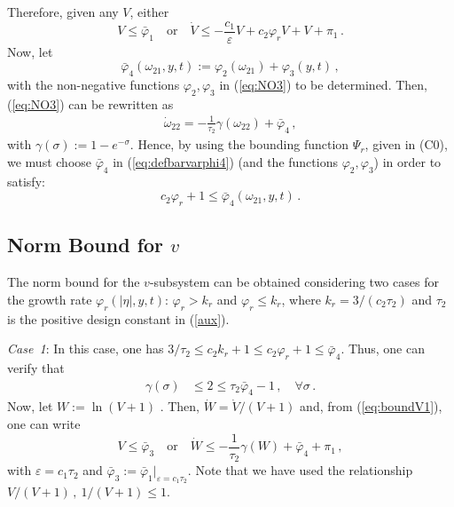 \documentclass{rncauth}
\begin{document}
Therefore, given any $V$, either %
%
\begin{equation}
V\leq\bar{\varphi}_1\quad \mbox{or} \quad \dot{V} \leq
-\frac{c_1}{\varepsilon} V +c_2 \varphi_r V+V+\pi_1\,.
\label{eq:boundV1}
\end{equation}
%
Now, let
%
\begin{equation}
\bar{\varphi}_4(\omega_{21},y,t):=\varphi_2(\omega_{21})+\varphi_3(y,t)\,,\label{eq:defbarvarphi4}
\end{equation}
%
with the non-negative functions $\varphi_{2},\varphi_3$ in
(\ref{eq:NO3}) to be determined. Then, (\ref{eq:NO3}) can be
rewritten as
%
\begin{align}
\dot{\omega}_{22}=-\frac{1}{\tau_2}\gamma(\omega_{22})+\bar{\varphi}_4\,,\label{aux}
\end{align}
%
with $\gamma(\sigma):=1-e^{-\sigma}$. Hence, by using the bounding
function $\Psi_r$, given in (C0), we must choose $\bar{\varphi}_4$
in (\ref{eq:defbarvarphi4}) (and the functions
$\varphi_{2},\varphi_3$) in order to satisfy:
%
$$c_2\varphi_r+1\leq\bar{\varphi}_4(\omega_{21},y,t)\,.$$
%

\subsection{Norm
Bound for $v$}


The norm bound for the $v$-subsystem can be obtained considering
two cases for the growth rate $\varphi_r(|\eta|,y,t)$: %
$\varphi_r>k_r$ and $\varphi_r \leq k_r$, where $k_r=3/(c_2\tau_2)$ and $\tau_2$
is the positive design constant in (\ref{aux}). %



{\em Case~1}: In this case, one has $3/\tau_2 \leq c_2 k_r +1 \leq
c_2 \varphi_r + 1 \leq \bar{\varphi}_4$. Thus, one can verify that
%
\begin{align}
\gamma(\sigma) &\leq  2 \leq \tau_2 \bar{\varphi}_4-1\,, \quad
\forall \sigma\,. %
\label{eq:condonalpha}
\end{align}
%
Now, let $W:=\ln(V+1)$ \cite{GAL:06}. Then, $\dot{W} =
\dot{V}/(V+1)$ and, from (\ref{eq:boundV1}), one can write
%
\begin{equation}%
V\leq\bar{\varphi}_3 \quad \mbox{or} \quad \dot{W} \leq
-\frac{1}{\tau_2} \gamma(W) +\bar{\varphi}_4 + \pi_1\,,
\label{eq:boundW1}
\end{equation}
with $\varepsilon=c_1\tau_2$ and
$\bar{\varphi}_3:=\bar{\varphi}_1|_{\varepsilon=c_1\tau_2}$. Note
that we have used the relationship $V/(V+1)\,, \ 1/(V+1) \leq 1$.
\end{document}
